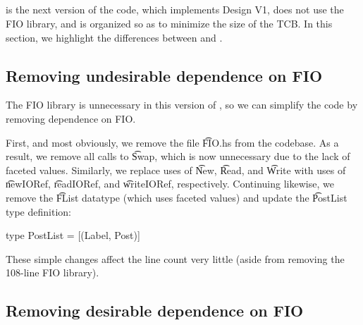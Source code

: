 \begin{refsection}
\section{\viN}

\myapp{} \viN{} is the next version of the code,
which implements Design V1,
does not use the FIO library,
and is organized so as to minimize the size of the TCB.
%
In this section,
we highlight the differences between \viF{} and \viN{}.

\subsection{Removing undesirable dependence on FIO}

The FIO library is unnecessary in this version of \myapp{},
so we can simplify the code by removing dependence on FIO.

First, and most obviously, we remove the file \t{FIO.hs} from the codebase.
%
As a result, we remove all calls to \t{Swap},
which is now unnecessary due to the lack of faceted values.
%
Similarly, we replace uses of \t{New}, \t{Read}, and \t{Write} with uses of \t{newIORef}, \t{readIORef}, and \t{writeIORef}, respectively.
%
Continuing likewise, we remove the \t{FList} datatype (which uses faceted values)
and update the \t{PostList} type definition:
\begin{fb}
type PostList = [(Label, Post)]
\end{fb}
These simple changes affect the line count very little
(aside from removing the 108-line FIO library).

\subsection{Removing desirable dependence on FIO}


\end{refsection}
